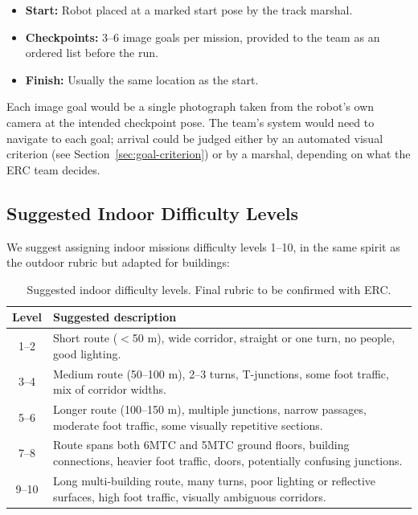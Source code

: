 \documentclass[11pt,a4paper]{article}
\begin{document}
\begin{itemize}
    \item \textbf{Start:} Robot placed at a marked start pose by the track marshal.
    \item \textbf{Checkpoints:} 3--6 image goals per mission, provided to the team as an ordered list before the run.
    \item \textbf{Finish:} Usually the same location as the start.
\end{itemize}

Each image goal would be a single photograph taken from the robot's own camera at the intended checkpoint pose. The team's system would need to navigate to each goal; arrival could be judged either by an automated visual criterion (see Section~\ref{sec:goal-criterion}) or by a marshal, depending on what the ERC team decides.


\subsection{Suggested Indoor Difficulty Levels}

We suggest assigning indoor missions difficulty levels 1--10, in the same spirit as the outdoor rubric but adapted for buildings:

\begin{table}[h]
\centering
\renewcommand{\arraystretch}{1.15}
\begin{tabular}{cp{11.5cm}}
\toprule
\textbf{Level} & \textbf{Suggested description} \\
\midrule
1--2 & Short route ($<$50 m), wide corridor, straight or one turn, no people, good lighting. \\
3--4 & Medium route (50--100 m), 2--3 turns, T-junctions, some foot traffic, mix of corridor widths. \\
5--6 & Longer route (100--150 m), multiple junctions, narrow passages, moderate foot traffic, some visually repetitive sections. \\
7--8 & Route spans both 6MTC and 5MTC ground floors, building connections, heavier foot traffic, doors, potentially confusing junctions. \\
9--10 & Long multi-building route, many turns, poor lighting or reflective surfaces, high foot traffic, visually ambiguous corridors. \\
\bottomrule
\end{tabular}
\caption{Suggested indoor difficulty levels. Final rubric to be confirmed with ERC.}
\end{table}
\end{document}
